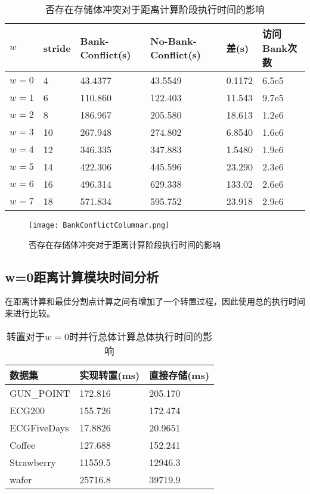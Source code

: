 \begin{table}[htbp]
	\centering
	\begin{minipage}{0.9\textwidth}
		\caption{否存在存储体冲突对于距离计算阶段执行时间的影响}
		\label{tab:BankConflictTimeWithW}
		\begin{tabular}{p{2cm}p{1cm}p{2cm}p{2cm}p{2cm}p{2cm}}
			\toprule[1.5pt]
			{\heiti $w$ } &{\heiti stride } &{\heiti Bank-Conflict(s) } &{\heiti No-Bank-Conflict(s) } &{\heiti 差(s) } &{\heiti 访问Bank次数 }
			\\\midrule[1pt]							
				$w=0$ & 4 & 43.4377 & 43.5549 & 0.1172 & 6.5e5 \\
				$w=1$ & 6 & 110.860 & 122.403 & 11.543 & 9.7e5 \\
				$w=2$ & 8 & 186.967 & 205.580 & 18.613 & 1.2e6 \\
				$w=3$ & 10 & 267.948 & 274.802 & 6.8540 & 1.6e6 \\
				$w=4$ & 12 & 346.335 & 347.883 & 1.5480 & 1.9e6 \\
				$w=5$ & 14 & 422.306 & 445.596 & 23.290 & 2.3e6 \\
				$w=6$ & 16 & 496.314 & 629.338 & 133.02 & 2.6e6 \\
				$w=7$ & 18 & 571.834 & 595.752 & 23.918 & 2.9e6 \\
			\bottomrule[1.5pt]
		\end{tabular}
	\end{minipage}
\end{table}

\begin{figure}[H] %
		\centering
		\texttt{[image: BankConflictColumnar.png]}
		\caption{否存在存储体冲突对于距离计算阶段执行时间的影响}
		\label{fig:BankConflictColumnar}
\end{figure}


\subsection{w=0距离计算模块时间分析}

在距离计算和最佳分割点计算之间有增加了一个转置过程，因此使用总的执行时间来进行比较。

\begin{table}[htbp]
	\centering
	\begin{minipage}{0.72\textwidth}
		\caption{转置对于$w=0$时并行总体计算总体执行时间的影响}
		\label{tab:transpose}
		\begin{tabular}{p{3cm}p{3cm}p{3cm}}
			\toprule[1.5pt]
			{\heiti 数据集 } &{\heiti 实现转置(ms) } &{\heiti 直接存储(ms) }
			\\\midrule[1pt]							
			GUN\_POINT & 172.816 & 205.170 \\
			ECG200 & 155.726 & 172.474\\
			ECGFiveDays & 17.8826 & 20.9651\\
			Coffee & 127.688 & 152.241\\
			Strawberry & 11559.5 & 12946.3\\
			wafer & 25716.8 & 39719.9 \\
			\bottomrule[1.5pt]
		\end{tabular}
	\end{minipage}
\end{table}

